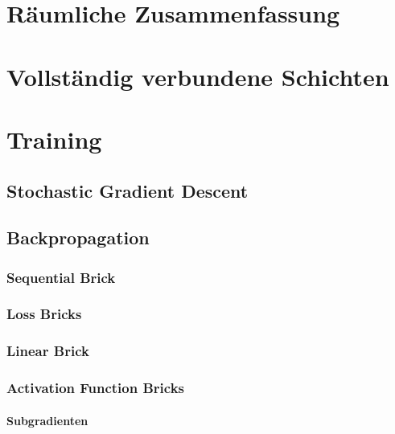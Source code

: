 	\section{Räumliche Zusammenfassung} %

	\section{Vollständig verbundene Schichten} %

	\section{Training} %

		\subsection{Stochastic Gradient Descent} %

		\subsection{Backpropagation} %

			\subsubsection{Sequential Brick} %

			\subsubsection{Loss Bricks} %

			\subsubsection{Linear Brick} %

			\subsubsection{Activation Function Bricks} %

				\paragraph{Subgradienten} %

